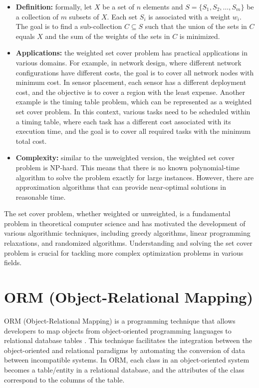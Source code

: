     \begin{itemize}
        \item \textbf{Definition:} formally, let $X$ be a set of $n$ elements and $S = \{S_1, S_2, \ldots, S_m\}$ be a collection of $m$ subsets of $X$. Each set $S_i$ is associated with a weight $w_i$. The goal is to find a sub-collection $C \subseteq S$ such that the union of the sets in $C$ equals $X$ and the sum of the weights of the sets in $C$ is minimized.
        \item \textbf{Applications:} the weighted set cover problem has practical applications in various domains. For example, in network design, where different network configurations have different costs, the goal is to cover all network nodes with minimum cost. In sensor placement, each sensor has a different deployment cost, and the objective is to cover a region with the least expense. Another example is the timing table problem, which can be represented as a weighted set cover problem. In this context, various tasks need to be scheduled within a timing table, where each task has a different cost associated with its execution time, and the goal is to cover all required tasks with the minimum total cost.
        \item \textbf{Complexity:} similar to the unweighted version, the weighted set cover problem is NP-hard. This means that there is no known polynomial-time algorithm to solve the problem exactly for large instances. However, there are approximation algorithms that can provide near-optimal solutions in reasonable time.
    \end{itemize}
    
    The set cover problem, whether weighted or unweighted, is a fundamental problem in theoretical computer science and has motivated the development of various algorithmic techniques, including greedy algorithms, linear programming relaxations, and randomized algorithms. Understanding and solving the set cover problem is crucial for tackling more complex optimization problems in various fields.
    


    \section{ORM (Object-Relational Mapping)} \label{sec:orm}

ORM (Object-Relational Mapping) is a programming technique that allows developers to map objects from object-oriented programming languages to relational database tables \cite{ambler2002object}. This technique facilitates the integration between the object-oriented and relational paradigms by automating the conversion of data between incompatible systems. In ORM, each class in an object-oriented system becomes a table/entity in a relational database, and the attributes of the class correspond to the columns of the table.

